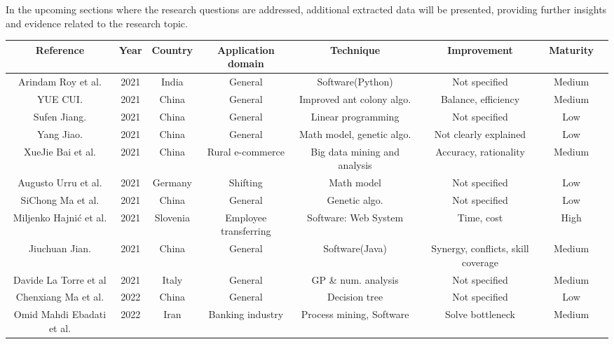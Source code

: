 \documentclass[runningheads]{llncs}
\begin{document}
\noindent
In the upcoming sections where the research questions are addressed, additional extracted data will be presented, providing further insights and evidence related to the research topic.

\begin{sidewaystable} %
\centering
\begin{tabular}{cccccccc}\hline
Reference & Year & Country & Application domain & Technique & Improvement & Maturity\\\hline
Arindam Roy et al.\cite{study10} & 2021 & India & General & Software(Python) & Not specified & Medium\\

YUE CUI.\cite{study12} & 2021 & China & General & Improved ant colony algo. & Balance, efficiency & Medium\\

Sufen Jiang.\cite{study13} & 2021 & China & General & Linear programming & Not specified & Low\\

Yang Jiao.\cite{study14} & 2021 & China & General & Math model, genetic algo. & Not clearly explained & Low\\

XueJie Bai et al.\cite{study15} & 2021 & China & Rural e-commerce & Big data mining and analysis & Accuracy, rationality & Medium\\

Augusto Urru et al.\cite{study16} & 2021 & Germany & Shifting & Math model & Not specified & Low \\

SiChong Ma et al.\cite{study17} & 2021 & China & General & Genetic algo. & Not specified & Low\\

Miljenko Hajnić et al.\cite{study18} & 2021 & Slovenia & Employee transferring & Software: Web System & Time, cost & High\\

Jiuchuan Jian.\cite{study19} & 2021 & China & General & Software(Java) & Synergy, conflicts, skill coverage & Medium &\\
Davide La Torre et al\cite{study2} & 2021 & Italy & General & GP \& num. analysis & Not specified & Medium\\


Chenxiang Ma et al.\cite{study3} & 2022 & China & General & Decision tree & Not specified & Low\\

Omid Mahdi Ebadati et al.\cite{study4}& 2022 & Iran & Banking industry & Process mining, Software & Solve bottleneck & Medium\\


\end{tabular}
\end{sidewaystable}
\end{document}
